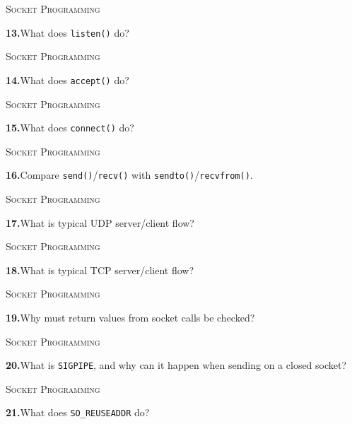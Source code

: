 \documentclass[11pt,a4paper]{article}
\newenvironment{questionblock}{%
  \begin{minipage}[t][0.455\textheight][t]{\textwidth}%
  \raggedright\small
}{%
  \vfill
  \end{minipage}%
}
\newcommand{\sectionlabel}[1]{\textsc{#1}\par\vspace{0.35em}}
\newcommand{\questionnumber}[1]{\textbf{#1.}\enspace}
\begin{document}
\vspace*{0.04\textheight}
\begin{questionblock}
\sectionlabel{Socket Programming}
\questionnumber{13}What does \verb|listen()| do?\par
\end{questionblock}
\newpage
\begin{questionblock}
\sectionlabel{Socket Programming}
\questionnumber{14}What does \verb|accept()| do?\par
\end{questionblock}
\vspace*{0.04\textheight}
\begin{questionblock}
\sectionlabel{Socket Programming}
\questionnumber{15}What does \verb|connect()| do?\par
\end{questionblock}
\newpage
\begin{questionblock}
\sectionlabel{Socket Programming}
\questionnumber{16}Compare \verb|send()|/\verb|recv()| with \verb|sendto()|/\verb|recvfrom()|.\par
\end{questionblock}
\vspace*{0.04\textheight}
\begin{questionblock}
\sectionlabel{Socket Programming}
\questionnumber{17}What is typical UDP server/client flow?\par
\end{questionblock}
\newpage
\begin{questionblock}
\sectionlabel{Socket Programming}
\questionnumber{18}What is typical TCP server/client flow?\par
\end{questionblock}
\vspace*{0.04\textheight}
\begin{questionblock}
\sectionlabel{Socket Programming}
\questionnumber{19}Why must return values from socket calls be checked?\par
\end{questionblock}
\newpage
\begin{questionblock}
\sectionlabel{Socket Programming}
\questionnumber{20}What is \verb|SIGPIPE|, and why can it happen when sending on a closed socket?\par
\end{questionblock}
\vspace*{0.04\textheight}
\begin{questionblock}
\sectionlabel{Socket Programming}
\questionnumber{21}What does \verb|SO_REUSEADDR| do?\par
\end{questionblock}
\end{document}
